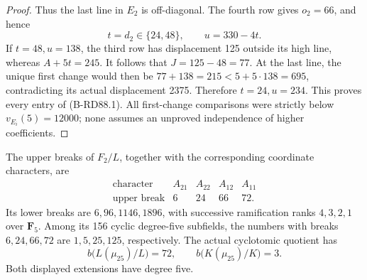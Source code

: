\begin{proof}
Thus the last line in \(E_2\) is off-diagonal.
The fourth row gives \(o_2=66\), and hence
\[
             t=d_2\in\{24,48\},\qquad u=330-4t.      \tag{B-RD88.4}
\]
If \(t=48,u=138\), the third row has displacement
125 outside its high line, whereas \(A+5t=245\).
It follows that \(J=125-48=77\). At the last line,
the unique first change would then be
\(77+138=215<5+5\cdot138=695\), contradicting its
actual displacement 2375. Therefore \(t=24,u=234\).
This proves every entry of (B-RD88.1). All first-change
comparisons were strictly below \(v_{E_i}(5)=12000\);
none assumes an unproved independence of higher coefficients.
\end{proof}

\begin{corollary}
\label{cor:B-RD88-cyclotomic}
The upper breaks of \(F_2/L\), together with the
corresponding coordinate characters, are
\[
\begin{array}{c|rrrr}
 \text{character}&A_{21}&A_{22}&A_{12}&A_{11}\\\hline
 \text{upper break}&6&24&66&72.
\end{array}                                             \tag{B-RD88.5}
\]
Its lower breaks are \(6,96,1146,1896\), with successive
ramification ranks \(4,3,2,1\) over \(\mathbf F_5\).
Among its 156 cyclic degree-five subfields, the numbers
with breaks \(6,24,66,72\) are \(1,5,25,125\), respectively.
The actual cyclotomic quotient has
\[
 b\bigl(L(\mu_{25})/L\bigr)=72,
 \qquad b\bigl(K(\mu_{25})/K\bigr)=3.                \tag{B-RD88.6}
\]
Both displayed extensions have degree five.
\end{corollary}
